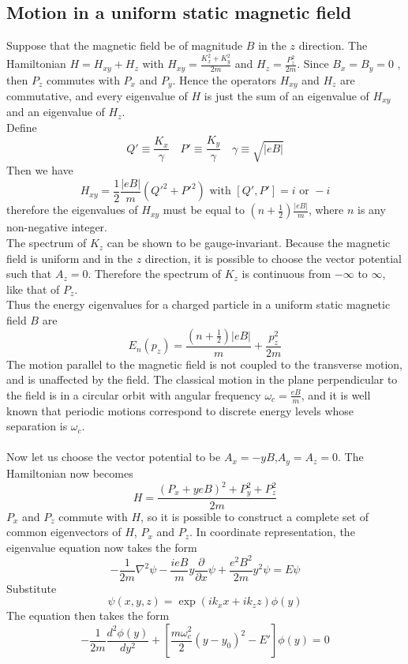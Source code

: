 \subsection{Motion in a uniform static magnetic field} 
Suppose that the magnetic field be of magnitude $B$ in the $z$ direction. The Hamiltonian $H = H_{xy}+H_z$ with $H_{xy} = \frac{K_x^2+K_y^2}{2m}$ and $H_z = \frac{P_z^2}{2m}$. Since $B_x = B_y = 0$ , then $P_z$ commutes with $P_x$ and $P_y$. Hence the operators $H_{xy}$ and $H_z$ are commutative, and every eigenvalue of $H$ is just
the sum of an eigenvalue of $H_{xy}$ and an eigenvalue of $H_z$. \\
Define
\[Q' \equiv \frac{K_x}{\gamma} \quad P' \equiv \frac{K_y}{\gamma} \quad \gamma \equiv \sqrt{|eB|} \]
Then we have
\[H_{xy} = \frac{1}{2} \frac{|eB|}{m}(Q'^2+P'^2) \mbox{  with  } [Q',P'] = i \mbox{  or  }-i\]
therefore the eigenvalues of $H_{xy}$ must be equal to $(n+\frac{1}{2})\frac{|eB|}{m}$, where $n$ is any non-negative integer.\\
The spectrum of $K_z$ can be shown to be gauge-invariant.
Because the magnetic field is uniform and in the $z$ direction, it is possible to choose the vector potential such that $A_z = 0$. Therefore the spectrum of $K_z$ is
continuous from $-\infty$ to $\infty$, like that of $P_z$.\\
Thus the energy eigenvalues for a charged particle in a uniform static magnetic field $B$ are
\[E_n(p_z) = \frac{(n+\frac{1}{2})|eB|}{m} + \frac{p_z^2}{2m}\]
The motion parallel to the magnetic field is not coupled to the transverse motion, and is unaffected by the field. The classical motion in the plane perpendicular to the field is
in a circular orbit with angular frequency $\omega_c = \frac{eB}{m}$, and it is well known that periodic motions correspond to discrete energy levels whose separation is $\omega_c$.\\ \\
Now let us choose the vector potential to be $A_x=-yB$,$A_y=A_z=0$. The Hamiltonian now becomes
\[H = \frac{(P_x+yeB)^2 + P_y^2 + P_z^2}{2m}\]
$P_x$ and $P_z$ commute with $H$, so it is possible to construct a complete set of common eigenvectors of $H$, $P_x$ and $P_z$. In coordinate representation, the eigenvalue equation now takes the form
\[-\frac{1}{2m}\nabla^2 \psi - \frac{ieB}{m}y\frac{\partial}{\partial x}\psi + \frac{e^2B^2}{2m}y^2\psi = E\psi\]
Substitute
\[\psi(x,y,z) = \exp(ik_xx+ik_zz)\phi(y)\]
The equation then takes the form
\[-\frac{1}{2m} \frac{d^2\phi(y)}{dy^2} + \left[ \frac{m\omega_c^2}{2}(y-y_0)^2-E' \right]\phi(y) = 0\]
